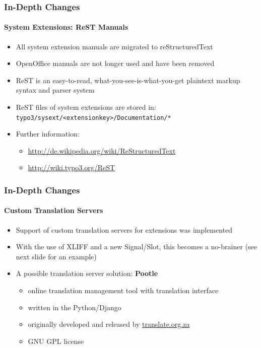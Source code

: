\begin{frame}[fragile]
	\frametitle{In-Depth Changes}
	\framesubtitle{System Extensions: ReST Manuals}

	\begin{itemize}
		\item All system extension manuals are migrated to reStructuredText
		\item OpenOffice manuals are not longer used and have been removed
		\item ReST is an easy-to-read, what-you-see-is-what-you-get plaintext markup syntax and parser system
		\item ReST files of system extensions are stored in:\newline
			\texttt{typo3/sysext/<extensionkey>/Documentation/*}

		\item Further information:

			\begin{itemize}
				\item \url{http://de.wikipedia.org/wiki/ReStructuredText}
				\item \url{http://wiki.typo3.org/ReST}
			\end{itemize}

	\end{itemize}

\end{frame}


\begin{frame}[fragile]
	\frametitle{In-Depth Changes}
	\framesubtitle{Custom Translation Servers}

	\begin{itemize}
		\item Support of custom translation servers for extensions was implemented
		\item With the use of XLIFF and a new Signal/Slot,\newline
			this becomes a no-brainer (see next slide for an example)
		\item A possible translation server solution: \textbf{Pootle}

			\begin{itemize}
				\item online translation management tool with translation interface
				\item written in the Python/Django
				\item originally developed and released by \url{translate.org.za}
				\item GNU GPL license
			\end{itemize}

	\end{itemize}

\end{frame}

